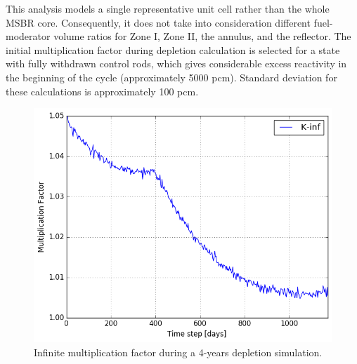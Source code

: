 \documentclass{anstrans}
\begin{document}
This analysis models a single representative unit cell rather than the whole 
\gls{MSBR} core. Consequently, it does not take into consideration different 
fuel-moderator volume ratios for Zone I, Zone II, the annulus, and the reflector. The 
initial multiplication factor during depletion calculation is selected for 
a state with fully withdrawn control rods, which gives 
considerable excess reactivity in the beginning of the cycle (approximately 5000 pcm). 
Standard deviation for these calculations is approximately 100 pcm.

\begin{figure}[htbp!] %
        \centering
        \includegraphics[width=1.03\linewidth]{keff.png}
        \caption{Infinite multiplication factor during a 4-years depletion 
        simulation.}
        \label{fig:keff}
\end{figure}

\FloatBarrier
\end{document}
